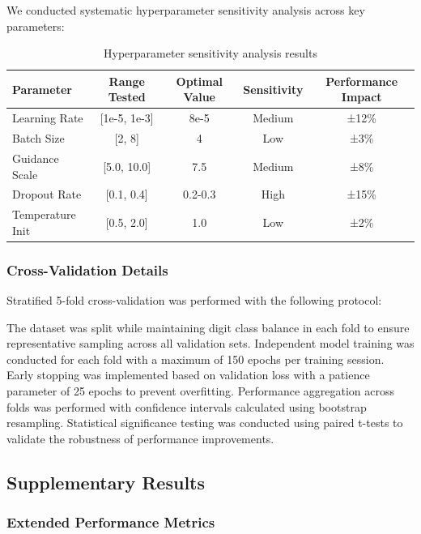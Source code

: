 \documentclass[11pt,a4paper]{article}
\begin{document}
We conducted systematic hyperparameter sensitivity analysis across key parameters:

\begin{table}[H]
\centering
\caption{Hyperparameter sensitivity analysis results}
\begin{tabular}{lcccc}
\toprule
\textbf{Parameter} & \textbf{Range Tested} & \textbf{Optimal Value} & \textbf{Sensitivity} & \textbf{Performance Impact} \\
\midrule
Learning Rate & [1e-5, 1e-3] & 8e-5 & Medium & ±12\% \\
Batch Size & [2, 8] & 4 & Low & ±3\% \\
Guidance Scale & [5.0, 10.0] & 7.5 & Medium & ±8\% \\
Dropout Rate & [0.1, 0.4] & 0.2-0.3 & High & ±15\% \\
Temperature Init & [0.5, 2.0] & 1.0 & Low & ±2\% \\
\bottomrule
\end{tabular}
\end{table}

\subsubsection*{Cross-Validation Details}

Stratified 5-fold cross-validation was performed with the following protocol:

The dataset was split while maintaining digit class balance in each fold to ensure representative sampling across all validation sets. Independent model training was conducted for each fold with a maximum of 150 epochs per training session. Early stopping was implemented based on validation loss with a patience parameter of 25 epochs to prevent overfitting. Performance aggregation across folds was performed with confidence intervals calculated using bootstrap resampling. Statistical significance testing was conducted using paired t-tests to validate the robustness of performance improvements.

\subsection*{Supplementary Results}

\subsubsection*{Extended Performance Metrics}
\end{document}
